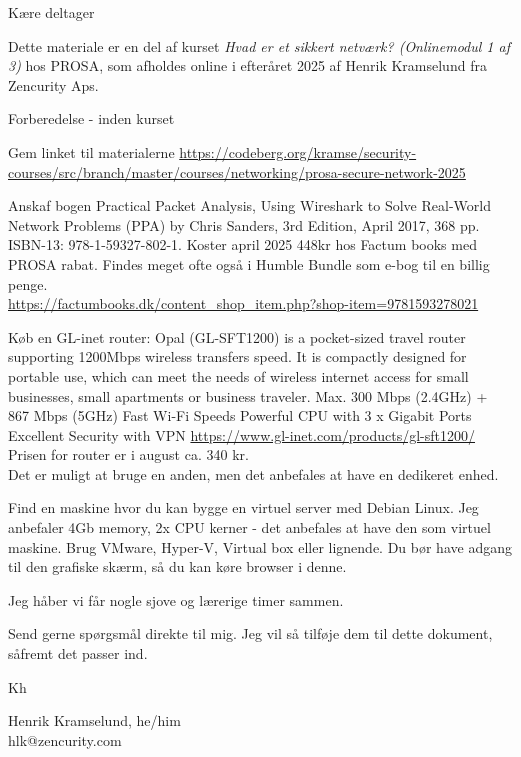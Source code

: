 \documentclass[a4paper,11pt,notitlepage,landscape]{report}
\begin{document}
\rm
{}

\newcommand{\subject}[1]{Introduction to Incident Response elective course}



\normal
Kære deltager

Dette materiale er en del af kurset
\emph{Hvad er et sikkert netværk? (Onlinemodul 1 af 3)} hos PROSA, som afholdes online i efteråret 2025 af Henrik Kramselund fra Zencurity Aps.

Forberedelse - inden kurset
\begin{list1}
\item[\faSquareO] Gem linket til materialerne
\url{https://codeberg.org/kramse/security-courses/src/branch/master/courses/networking/prosa-secure-network-2025
}

\item[\faSquareO] Anskaf bogen Practical Packet Analysis, Using Wireshark to Solve Real-World Network Problems (PPA) by Chris Sanders, 3rd Edition, April 2017, 368 pp. ISBN-13: 978-1-59327-802-1. Koster april 2025 448kr hos Factum books med PROSA rabat. Findes meget ofte også i Humble Bundle som e-bog til en billig penge.\\
\url{https://factumbooks.dk/content_shop_item.php?shop-item=9781593278021}
\item[\faSquareO] Køb en GL-inet router: Opal (GL-SFT1200) is a pocket-sized travel router supporting 1200Mbps wireless transfers speed. It is compactly designed for portable use, which can meet the needs of wireless internet access for small businesses, small apartments or business traveler. Max. 300 Mbps (2.4GHz) + 867 Mbps (5GHz) Fast Wi-Fi Speeds Powerful CPU with 3 x Gigabit Ports Excellent Security with VPN \url{https://www.gl-inet.com/products/gl-sft1200/}
Prisen for router er i august ca. 340 kr.\\
Det er muligt at bruge en anden, men det anbefales at have en dedikeret enhed.
\item[\faSquareO] Find en maskine hvor du kan bygge en virtuel server med Debian Linux. Jeg anbefaler  4Gb memory, 2x CPU kerner - det anbefales at have den som virtuel maskine. Brug VMware, Hyper-V, Virtual box eller lignende. Du bør have adgang til den grafiske skærm, så du kan køre browser i denne.

\end{list1}

Jeg håber vi får nogle sjove og lærerige timer sammen.

Send gerne spørgsmål direkte til mig. Jeg vil så tilføje dem til dette dokument, såfremt det passer ind.

Kh

Henrik Kramselund, he/him\\
hlk@zencurity.com
\end{document}
